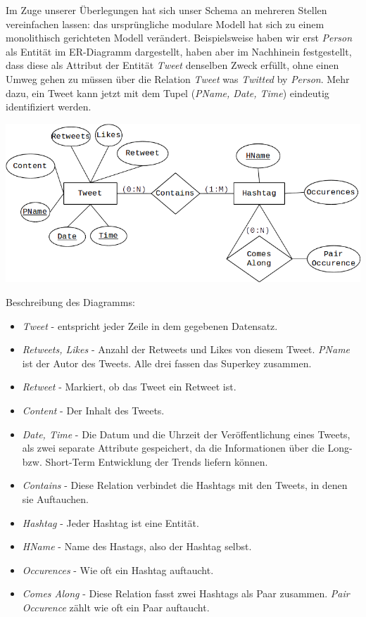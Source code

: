 \documentclass[paper=a4, english, ngerman, romanian]{scrartcl}
\begin{document}
	
	Im Zuge unserer Überlegungen hat sich unser Schema an mehreren Stellen vereinfachen lassen: das ursprüngliche modulare Modell hat sich zu einem monolithisch gerichteten Modell verändert. Beispielsweise haben wir erst \textit{Person} als Entität im ER-Diagramm dargestellt, haben aber im Nachhinein festgestellt, dass diese als Attribut der Entität \textit{Tweet} denselben Zweck erfüllt, ohne einen Umweg gehen zu müssen über die Relation \textit{Tweet} was \textit{Twitted} by \textit{Person}. Mehr dazu, ein Tweet kann jetzt mit dem Tupel (\textit{PName, Date, Time}) eindeutig identifiziert werden.
		
	\begin{center}
	\includegraphics[scale=0.6]{MinMax_Diagram2}
	\end{center}
\pagebreak	
	Beschreibung des Diagramms:
	
	\begin{itemize}
	\item \textit{Tweet} - entspricht jeder Zeile in dem gegebenen Datensatz.
	\item \textit{Retweets, Likes} - Anzahl der Retweets und Likes von diesem Tweet. \textit{PName} ist der Autor des Tweets. Alle drei fassen das Superkey zusammen.
	\item \textit{Retweet} - Markiert, ob das Tweet ein Retweet ist.
	\item \textit{Content} - Der Inhalt des Tweets.
	\item \textit{Date, Time} - Die Datum und die Uhrzeit der Veröffentlichung eines Tweets, als zwei separate Attribute gespeichert, da die Informationen über die Long- bzw. Short-Term Entwicklung der Trends liefern können.
	\item \textit{Contains} - Diese Relation verbindet die Hashtags mit den Tweets, in denen sie Auftauchen.
	\item \textit{Hashtag} - Jeder Hashtag ist eine Entität.
	\item \textit{HName} - Name des Hastags, also der Hashtag selbst.
	\item \textit{Occurences} - Wie oft ein Hashtag auftaucht.
	\item \textit{Comes Along} - Diese Relation fasst zwei Hashtags als Paar zusammen. \textit{Pair Occurence} zählt wie oft ein Paar auftaucht.
	\end{itemize}
\end{document}

